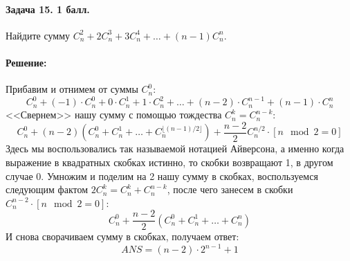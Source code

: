 \documentclass[12pt]{article}
\begin{document}
\paragraph{Задача 15. 1 балл.} Найдите сумму $ C_n^2 + 2C_n^3 + 3C_n^4 + \dots + (n-1)C_n^n $. 

\paragraph{\bf Решение:}
Прибавим и отнимем от суммы $ C_n^0 $:
$$
C_n^0 + (-1) \cdot C_n^0 + 0\cdot C_n^1 + 1\cdot C_n^2 + \dots + (n-2)\cdot C_n^{n-1} + (n-1)\cdot C_n^n
$$
<<Свернем>> нашу сумму с помощью тождества $ C_n^k = C_n^{n - k} $:
$$
C_n^0 + (n - 2)\left(C_n^0 + C_n^1 + \dots + C_n^{\lfloor (n-1)/2 \rfloor}\right) + \frac{n-2}{2}C_n^{n/2}\cdot [n \mod 2 = 0]
$$
Здесь мы воспользовались так называемой нотацией Айверсона, а именно когда выражение в квадратных скобках
истинно, то скобки возвращают 1, в другом случае 0.
Умножим и поделим на 2 нашу сумму в скобках, воспользуемся следующим
фактом $ 2C_n^k = C_n^k + C_n^{n - k} $, после чего занесем в скобки $C_n^{n-2}\cdot [n \mod 2 = 0]$:
$$
C_n^0 + \frac{n - 2}{2}\left(C_n^0 + C_n^1 + \dots + C_n^n\right)
$$
И снова сворачиваем сумму в скобках, получаем ответ:
$$
ANS = (n - 2)\cdot 2^{n - 1} + 1
$$
\end{document}

